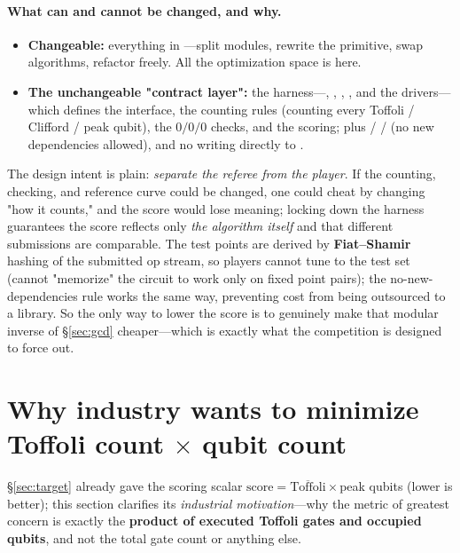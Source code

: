 \documentclass[11pt]{article}
\newcommand{\secref}[1]{\hyperref[#1]{\S\ref*{#1}}}
\begin{document}
\paragraph{What can and cannot be changed, and why.}
\begin{itemize}[leftmargin=1.4em]
\item \textbf{Changeable:} everything in ---split modules, rewrite the primitive, swap algorithms, refactor freely. All the optimization space is here.
\item \textbf{The unchangeable "contract layer":} the harness---, , ,
, and the  drivers---which defines the interface, the counting rules (counting every Toffoli / Clifford / peak qubit), the $0/0/0$ checks, and the scoring;
plus  /  /  (no new dependencies allowed), and no writing directly to .
\end{itemize}
The design intent is plain: \emph{separate the referee from the player}. If the counting, checking, and reference curve could be changed, one could cheat by changing "how it counts," and the score would lose meaning; locking down the harness
guarantees the score reflects only \emph{the algorithm itself} and that different submissions are comparable. The test points are derived by \textbf{Fiat--Shamir} hashing of the submitted op stream, so players cannot tune to the test set
(cannot "memorize" the circuit to work only on fixed point pairs); the no-new-dependencies rule works the same way, preventing cost from being outsourced to a library. So the only way to lower the score is to genuinely make that modular inverse
of \secref{sec:gcd} cheaper---which is exactly what the competition is designed to force out.

\section{Why industry wants to minimize Toffoli count $\times$ qubit count}
\label{sec:cost}

\secref{sec:target} already gave the scoring scalar $\text{score}=\overline{\text{Toffoli}}\times$peak qubits (lower is better); this section clarifies its
\emph{industrial motivation}---why the metric of greatest concern is exactly the \textbf{product of executed Toffoli gates and occupied qubits}, and not the total gate count or anything else.
\end{document}
